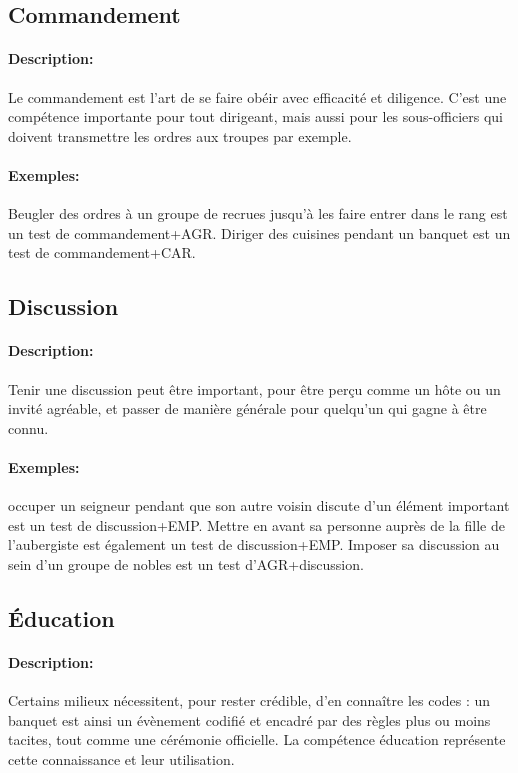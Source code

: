 \documentclass[10pt,a4paper,twocolumn]{book}
\begin{document}
\subsection{Commandement}
\paragraph{Description:}Le commandement est l'art de se faire obéir avec efficacité et diligence. C'est une compétence importante pour tout dirigeant, mais aussi pour les sous-officiers qui doivent transmettre les ordres aux troupes par exemple.
\paragraph{Exemples:}Beugler des ordres à un groupe de recrues jusqu'à les faire entrer dans le rang est un test de commandement+AGR. Diriger des cuisines pendant un banquet est un test de commandement+CAR.
\subsection{Discussion}
\paragraph{Description:}Tenir une discussion peut être important, pour être perçu comme un hôte ou un invité agréable, et passer de manière générale pour quelqu'un qui gagne à être connu.
\paragraph{Exemples:}occuper un seigneur pendant que son autre voisin discute d'un élément important est un test de discussion+EMP. Mettre en avant sa personne auprès de la fille de l'aubergiste est également un test de discussion+EMP. Imposer sa discussion au sein d'un groupe de nobles est un test d'AGR+discussion.
\subsection{Éducation}
\paragraph{Description:}Certains milieux nécessitent, pour rester crédible, d'en connaître les codes : un banquet est ainsi un évènement codifié et encadré par des règles plus ou moins tacites, tout comme une cérémonie officielle. La compétence éducation représente cette connaissance et leur utilisation.
\end{document}
